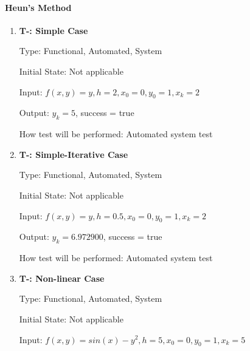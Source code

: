 \documentclass[12pt, titlepage]{article}
\newcounter{tnum} %
\begin{document}
\paragraph{Heun's Method}
\begin{enumerate}

\item{\textbf{T-\thetnum \label{t-heun_simple}: Simple Case}}

Type: Functional, Automated, System %
					
Initial State: Not applicable
					
Input: $f(x, y) = y, h = 2, x_0 = 0, y_0 = 1, x_k = 2$
					
Output: $y_k = 5$, success = true
					
How test will be performed: Automated system test


\item{\textbf{T-\thetnum \label{t-heun_simpleiterative}: Simple-Iterative Case}}

Type: Functional, Automated, System %
					
Initial State: Not applicable
					
Input: $f(x, y) = y, h = 0.5, x_0 = 0, y_0 = 1, x_k = 2$
					
Output: $y_k = 6.972900$, success = true
					
How test will be performed: Automated system test

\item{\textbf{T-\thetnum \label{t-heun_nonlinear}: Non-linear Case}}

Type: Functional, Automated, System %
					
Initial State: Not applicable
					
Input: $f(x, y) = sin(x) - y^2, h = 5, x_0 = 0, y_0 = 1, x_k = 5$
					

\end{enumerate}
\end{document}
